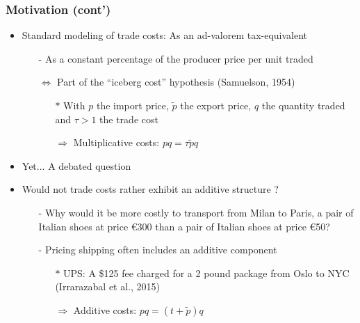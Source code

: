 \documentclass[10 pt,Helvetica, french]{beamer}
\begin{document}
\begin{frame}
\frametitle{Motivation (cont')}
\begin{itemize}
\item Standard modeling of trade costs: As an ad-valorem tax-equivalent \vspace{0.1cm}
\begin{itemize}
\item[-] As a constant percentage of the producer price per unit traded \vspace{0.1cm}
\item[$\Leftrightarrow$] Part of the ``iceberg cost'' hypothesis (Samuelson, 1954) \vspace{0.1cm}
\begin{itemize}
\item[$\ast$] With $p$ the import price, $\widetilde{p}$ the export price, $q$ the quantity traded and $\tau >1$ the trade cost \vspace{0.1cm}
\item[$\Rightarrow$] Multiplicative costs:     \footnotesize $pq = \tau \widetilde{p}q$
\normalsize
\end{itemize}
\end{itemize}
\item Yet... A debated question \vspace{0.1cm}
\item Would not trade costs rather exhibit an additive structure ?  \vspace{0.1cm} \vspace{0.1cm}
\begin{itemize}
\item[-] Why would it be more costly to transport from Milan to Paris, a pair of Italian shoes at price \euro 300 than a pair of Italian shoes at price \euro 50? \vspace{0.1cm}
\item[-] Pricing shipping often includes an additive component \vspace{0.1cm}
\begin{itemize}
\item[$\ast$] UPS: A \$125 fee charged for a 2 pound package from Oslo to NYC (Irrarazabal et al., 2015) \vspace{0.1cm}
\item[$\Rightarrow$] Additive costs: \footnotesize $pq = (t+\widetilde{p})q  $
\end{itemize}
\end{itemize}
\end{itemize}
\end{frame}
\end{document}
